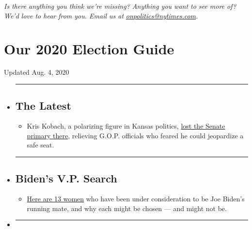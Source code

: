 \emph{Is there anything you think we're missing? Anything you want to
see more of? We'd love to hear from you. Email us at}
\href{mailto:onpolitics@nytimes.com}{\emph{onpolitics@nytimes.com}}\emph{.}

\hypertarget{our-2020-election-guide}{%
\section{Our 2020 Election Guide}\label{our-2020-election-guide}}

Updated Aug. 4, 2020

\begin{itemize}
\item
  \begin{center}\rule{0.5\linewidth}{\linethickness}\end{center}

  \hypertarget{the-latest}{%
  \subsection{The Latest}\label{the-latest}}

  \begin{itemize}
  \tightlist
  \item
    Kris Kobach, a polarizing figure in Kansas politics,
    \href{https://www.nytimes.com/2020/08/04/us/politics/kobach-tlaib.html?action=click\&pgtype=Article\&state=default\&region=BELOW_MAIN_CONTENT\&context=storylines_guide}{lost
    the Senate primary there}, relieving G.O.P. officials who feared he
    could jeopardize a safe seat.
  \end{itemize}
\item
  \begin{center}\rule{0.5\linewidth}{\linethickness}\end{center}

  \hypertarget{bidens-vp-search}{%
  \subsection{Biden's V.P. Search}\label{bidens-vp-search}}

  \begin{itemize}
  \tightlist
  \item
    \href{https://www.nytimes.com/article/biden-vice-president-2020.html?action=click\&pgtype=Article\&state=default\&region=BELOW_MAIN_CONTENT\&context=storylines_guide}{Here
    are 13 women} who have been under consideration to be Joe Biden's
    running mate, and why each might be chosen --- and might not be.
  \end{itemize}
\item
  \begin{center}\rule{0.5\linewidth}{\linethickness}\end{center}


\end{itemize}
